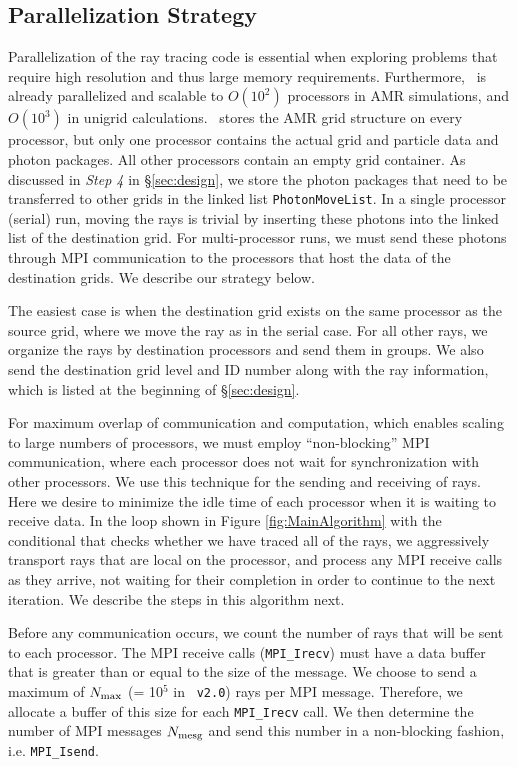 \documentclass[apj,onecolumn]{emulateapj}
\begin{document}
\subsection{Parallelization Strategy}
\label{sec:parallel}

Parallelization of the ray tracing code is essential when exploring
problems that require high resolution and thus large memory
requirements.  Furthermore, \enzo~is already parallelized and scalable
to $O(10^2)$ processors in AMR simulations, and $O(10^3)$ in unigrid
calculations.  \enzo~stores the AMR grid structure on every processor,
but only one processor contains the actual grid and particle data and
photon packages.  All other processors contain an empty grid
container.  As discussed in \textit{Step 4} in \S\ref{sec:design}, we
store the photon packages that need to be transferred to other grids
in the linked list \texttt{PhotonMoveList}.  In a single processor
(serial) run, moving the rays is trivial by inserting these photons
into the linked list of the destination grid.  For multi-processor
runs, we must send these photons through MPI communication to the
processors that host the data of the destination grids.  We describe
our strategy below.

The easiest case is when the destination grid exists on the same
processor as the source grid, where we move the ray as in the serial
case.  For all other rays, we organize the rays by destination
processors and send them in groups.  We also send the destination grid
level and ID number along with the ray information, which is listed at
the beginning of \S\ref{sec:design}.  

For maximum overlap of communication and computation, which enables
scaling to large numbers of processors, we must employ
``non-blocking'' MPI communication, where each processor does not wait
for synchronization with other processors.  We use this technique for
the sending and receiving of rays.  Here we desire to minimize the
idle time of each processor when it is waiting to receive data.  In
the loop shown in Figure \ref{fig:MainAlgorithm} with the conditional
that checks whether we have traced all of the rays, we aggressively
transport rays that are local on the processor, and process any MPI
receive calls as they arrive, not waiting for their completion in
order to continue to the next iteration.  We describe the steps in
this algorithm next.

 Before any communication occurs, we count the number of rays
that will be sent to each processor.  The MPI receive calls
(\texttt{MPI\_Irecv}) must have a data buffer that is greater than or
equal to the size of the message.  We choose to send a maximum of
$N_{\rm max}$ (= 10$^5$ in \enzo~\texttt{v2.0}) rays per MPI message.
Therefore, we allocate a buffer of this size for each
\texttt{MPI\_Irecv} call.  We then determine the number of MPI messages
$N_{\rm mesg}$ and send this number in a non-blocking fashion,
i.e. \texttt{MPI\_Isend}.
\end{document}
